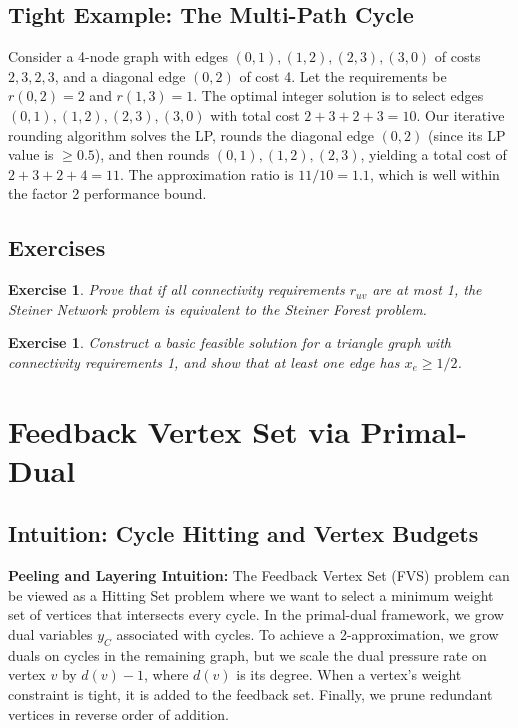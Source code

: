\documentclass[11pt,oneside]{book}
\newtheorem{exercise}[theorem]{Exercise}
\begin{document}
\section{Tight Example: The Multi-Path Cycle}
Consider a 4-node graph with edges $(0, 1), (1, 2), (2, 3), (3, 0)$ of costs $2, 3, 2, 3$, and a diagonal edge $(0, 2)$ of cost 4. Let the requirements be $r(0, 2) = 2$ and $r(1, 3) = 1$.
The optimal integer solution is to select edges $(0, 1), (1, 2), (2, 3), (3, 0)$ with total cost $2 + 3 + 2 + 3 = 10$.
Our iterative rounding algorithm solves the LP, rounds the diagonal edge $(0, 2)$ (since its LP value is $\ge 0.5$), and then rounds $(0, 1), (1, 2), (2, 3)$, yielding a total cost of $2 + 3 + 2 + 4 = 11$.
The approximation ratio is $11/10 = 1.1$, which is well within the factor 2 performance bound.

\section{Exercises}
\begin{exercise}
Prove that if all connectivity requirements $r_{uv}$ are at most 1, the Steiner Network problem is equivalent to the Steiner Forest problem.
\end{exercise}
\begin{exercise}
Construct a basic feasible solution for a triangle graph with connectivity requirements 1, and show that at least one edge has $x_e \ge 1/2$.
\end{exercise}

\setcounter{chapter}{22}
\chapter{Feedback Vertex Set via Primal-Dual}
\label{ch:fvs_primal_dual}

\section{Intuition: Cycle Hitting and Vertex Budgets}

\begin{intuitionbox}
\textbf{Peeling and Layering Intuition:} The Feedback Vertex Set (FVS) problem can be viewed as a Hitting Set problem where we want to select a minimum weight set of vertices that intersects every cycle. In the primal-dual framework, we grow dual variables $y_C$ associated with cycles. To achieve a 2-approximation, we grow duals on cycles in the remaining graph, but we scale the dual pressure rate on vertex $v$ by $d(v) - 1$, where $d(v)$ is its degree. When a vertex's weight constraint is tight, it is added to the feedback set. Finally, we prune redundant vertices in reverse order of addition.
\end{intuitionbox}
\end{document}
